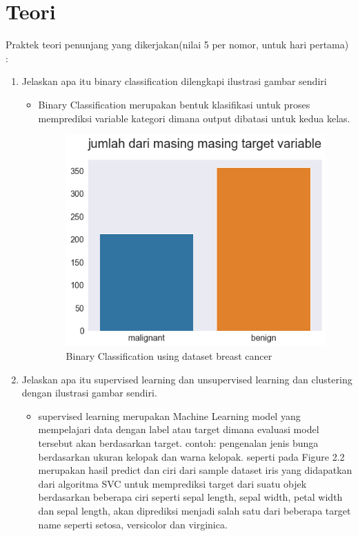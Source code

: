 \section{Teori}
Praktek teori penunjang yang dikerjakan(nilai 5 per nomor, untuk hari pertama) :
\begin{enumerate}
\item
Jelaskan apa itu binary classification dilengkapi ilustrasi gambar sendiri
\begin{itemize}
 \newpage 
\item Binary Classification merupakan bentuk klasifikasi untuk proses memprediksi variable kategori dimana output dibatasi untuk kedua kelas.
\begin{figure}[h]
    \centering
    \includegraphics[scale=0.5]{figures/chapter 2/1.png}
    \caption{Binary Classification using dataset breast cancer}
    \label{fig:mesh1}
\end{figure}
\end{itemize}
\newpage \item
Jelaskan apa itu supervised learning dan unsupervised learning dan clustering dengan ilustrasi gambar sendiri.
\begin{itemize}
\item supervised learning merupakan Machine Learning model yang mempelajari data dengan label atau target dimana evaluasi model tersebut akan berdasarkan
target. contoh: pengenalan jenis bunga berdasarkan ukuran kelopak
dan warna kelopak. seperti pada Figure 2.2 merupakan hasil predict dan ciri dari sample dataset iris yang didapatkan dari algoritma SVC untuk memprediksi target dari suatu objek berdasarkan beberapa ciri seperti sepal length, sepal width, petal width dan sepal length, akan diprediksi menjadi salah satu dari beberapa target name seperti setosa, versicolor dan virginica.

\end{itemize}
\end{enumerate}
